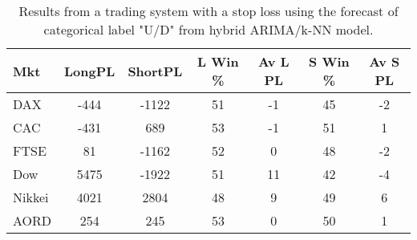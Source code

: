 \begin{table}[ht]
\centering
\caption[Results from a trading system with a stop loss using the forecast of categorical label "U/D" from hybrid ARIMA/k-NN model]{Results from a trading system with a stop loss using the forecast of categorical label "U/D" from hybrid ARIMA/k-NN model.} 
\label{tab:chp_ts:pUD_CAT_arima_knn_sys_SL}
\begin{tabular}{lcccccc}
  \toprule Mkt & LongPL & ShortPL & L Win \% & Av L PL & S Win \% & Av S PL \\ 
  \midrule DAX & -444 & -1122 & 51 & -1 & 45 & -2 \\ 
  CAC & -431 & 689 & 53 & -1 & 51 & 1 \\ 
  FTSE & 81 & -1162 & 52 & 0 & 48 & -2 \\ 
  Dow & 5475 & -1922 & 51 & 11 & 42 & -4 \\ 
  Nikkei & 4021 & 2804 & 48 & 9 & 49 & 6 \\ 
  AORD & 254 & 245 & 53 & 0 & 50 & 1 \\ 
   \bottomrule \end{tabular}
\end{table}
